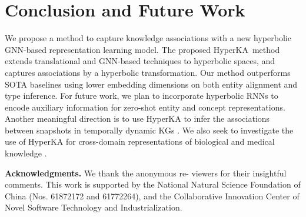 \documentclass[11pt,a4paper]{article}
\newcommand{\modelname}{HyperKA\xspace}
\begin{document}
 \section{Conclusion and Future Work}
We propose a method to capture knowledge associations with a new hyperbolic GNN-based representation learning model. The proposed \modelname\ method extends translational and GNN-based techniques to hyperbolic spaces, and captures associations by a hyperbolic transformation. Our method outperforms SOTA baselines using lower embedding dimensions on both entity alignment and type inference. For future work, we plan to incorporate hyperbolic RNNs \cite{HNN} to encode auxiliary information for zero-shot entity and concept representations. Another meaningful direction is to use \modelname to infer the associations between snapshots in temporally dynamic KGs \cite{Xu2020Inductive}. We also seek to investigate the use of \modelname for cross-domain representations of biological and medical knowledge \cite{BIO-JOIE}.

\smallskip\noindent\textbf{Acknowledgments.} We thank the anonymous re- viewers for their insightful comments. This work is supported by the National Natural Science Foundation of China (Nos. 61872172 and 61772264), and the Collaborative Innovation Center of Novel Software Technology and Industrialization. 


\clearpage
\appendix
\end{document}
